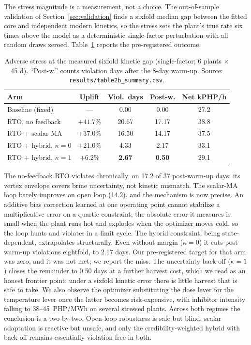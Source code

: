 \documentclass[review,number,sort&compress]{elsarticle}
\begin{document}
The stress magnitude is a measurement, not a choice. The out-of-sample
validation of Section~\ref{sec:validation} finds a sixfold median gap
between the fitted core and independent modern kinetics, so the stress
sets the plant's true rate six times above the model as a deterministic
single-factor perturbation with all random draws zeroed.
Table~\ref{tab:stress} reports the pre-registered outcome.
\begin{table}[t]\centering
\caption{Adverse stress at the measured sixfold kinetic gap
(single-factor; 6 plants $\times$ 45 d). ``Post-w.'' counts violation
days after the 8-day warm-up. Source:
\texttt{results/table2b\_summary.csv}.}
\label{tab:stress}
\begin{tabular}{lcccc}
\toprule
Arm & Uplift & Viol.\ days & Post-w. & Net kPHP/h \\
\midrule
Baseline (fixed) & --- & 0.00 & 0.00 & 27.2 \\
RTO, no feedback & $+41.7\%$ & 20.67 & 17.17 & 38.8 \\
RTO + scalar MA & $+37.0\%$ & 16.50 & 14.17 & 37.5 \\
RTO + hybrid, $\kappa{=}0$ & $+21.0\%$ & 4.33 & 2.17 & 33.1 \\
RTO + hybrid, $\kappa{=}1$ & $+6.2\%$ & \textbf{2.67} & \textbf{0.50} & 29.1 \\
\bottomrule
\end{tabular}
\end{table}
The no-feedback RTO violates chronically, on 17.2 of 37 post-warm-up
days: its vertex envelope covers brine uncertainty, not kinetic
mismatch. The scalar-MA loop barely improves on open loop (14.2), and
the mechanism is now precise. An additive bias correction learned at
one operating point cannot stabilize a multiplicative error on a
quartic constraint; the absolute error it measures is small when the
plant runs hot and explodes when the optimizer moves cold, so the loop
hunts and violates in a limit cycle. The hybrid constraint, being
state-dependent, extrapolates structurally. Even without margin
($\kappa{=}0$) it cuts post-warm-up violations eightfold, to 2.17 days.
Our pre-registered target for that arm was zero, and it was not met; we
report the miss. The uncertainty back-off ($\kappa{=}1$) closes the
remainder to 0.50 days at a further harvest cost, which we read as an
honest frontier point: under a sixfold kinetic error there is little
harvest that is safe to take. We also observe the optimizer
substituting the dose lever for the temperature lever once the latter
becomes risk-expensive, with inhibitor intensity falling to
38--45~PHP/MWh on several stressed plants. Across both regimes the
conclusion is a two-by-two. Open-loop robustness is safe but blind,
scalar adaptation is reactive but unsafe, and only the
credibility-weighted hybrid with back-off remains essentially
violation-free in both.
\end{document}

